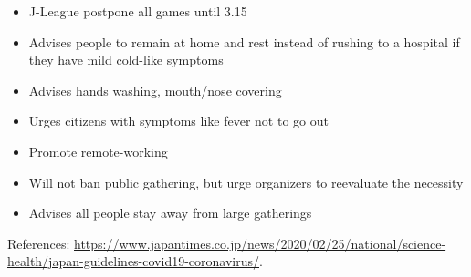 \documentclass[onecolumn,journal]{IEEEtran}
\begin{document}
\begin{itemize}
\item J-League postpone all games until 3.15
\item Advises people to remain at home and rest instead of rushing to a hospital if they have mild cold-like symptoms
\item Advises hands washing, mouth/nose covering
\item Urges citizens with symptoms like fever not to go out
\item Promote remote-working
\item Will not ban public gathering, but urge organizers to reevaluate the necessity
\item Advises all people stay away from large gatherings
\end{itemize}

References: \url{https://www.japantimes.co.jp/news/2020/02/25/national/science-health/japan-guidelines-covid19-coronavirus/}.



% 

\end{document}
